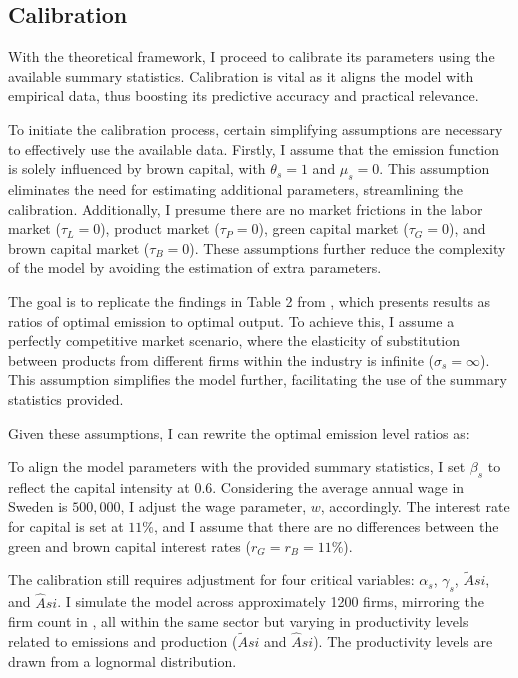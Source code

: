 \subsection{Calibration} \label{sec:Calibration}
With the theoretical framework, I proceed to calibrate its parameters using the available summary statistics. Calibration is vital as it aligns the model with empirical data, thus boosting its predictive accuracy and practical relevance.

To initiate the calibration process, certain simplifying assumptions are necessary to effectively use the available data. Firstly, I assume that the emission function is solely influenced by brown capital, with $\theta_s = 1$ and $\mu_s = 0$. This assumption eliminates the need for estimating additional parameters, streamlining the calibration. Additionally, I presume there are no market frictions in the labor market ($\tau_L = 0$), product market ($\tau_P = 0$), green capital market ($\tau_G = 0$), and brown capital market ($\tau_B = 0$). These assumptions further reduce the complexity of the model by avoiding the estimation of extra parameters.

The goal is to replicate the findings in Table 2 from \cite{martinsson2024effect}, which presents results as ratios of optimal emission to optimal output. To achieve this, I assume a perfectly competitive market scenario, where the elasticity of substitution between products from different firms within the industry is infinite ($\sigma_s = \infty$). This assumption simplifies the model further, facilitating the use of the summary statistics provided.

Given these assumptions, I can rewrite the optimal emission level ratios as:


To align the model parameters with the provided summary statistics, I set $\beta_s$ to reflect the capital intensity at $0.6$. Considering the average annual wage in Sweden is $500,000$, I adjust the wage parameter, $w$, accordingly. The interest rate for capital is set at $11\%$, and I assume that there are no differences between the green and brown capital interest rates ($r_G=r_B = 11\%$).

The calibration still requires adjustment for four critical variables: $\alpha_s$, $\gamma_s$, $\tilde{A}{si}$, and $\hat{A}{si}$. I simulate the model across approximately 1200 firms, mirroring the firm count in \cite{martinsson2024effect}, all within the same sector but varying in productivity levels related to emissions and production ($\tilde{A}{si}$ and $\hat{A}{si}$). The productivity levels are drawn from a lognormal distribution.

